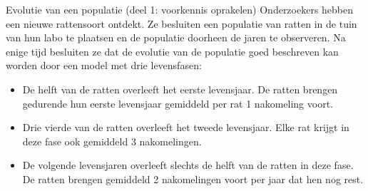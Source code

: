 \begin{lesactiviteit}{Evolutie van een populatie (deel 1: voorkennis oprakelen)}
Onderzoekers hebben een nieuwe rattensoort ontdekt. Ze besluiten een populatie van ratten in de tuin van hun labo te plaatsen en de populatie doorheen de jaren te observeren. Na enige tijd besluiten ze dat de evolutie van de populatie goed beschreven kan worden door een model met drie levensfasen:
\begin{itemize}
    \item De helft van de ratten overleeft het eerste levensjaar. De ratten brengen gedurende
hun eerste levensjaar gemiddeld per rat 1 nakomeling voort.
    \item Drie vierde van de ratten overleeft het tweede levensjaar. Elke rat krijgt in deze fase
ook gemiddeld 3 nakomelingen.
    \item De volgende levensjaren overleeft slechts de helft van de ratten in deze fase. De ratten brengen gemiddeld 2 nakomelingen voort per jaar dat hen nog rest.
\end{itemize}


\end{lesactiviteit}
